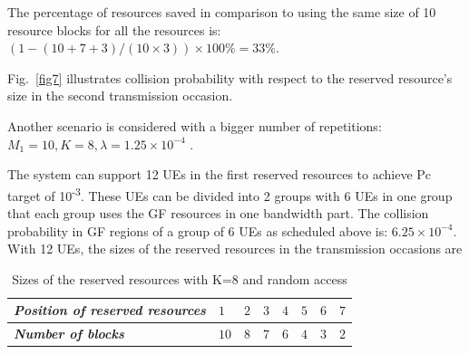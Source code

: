 \documentclass[conference]{IEEEtran}
\begin{document}

The percentage of resources saved in comparison to using the same size of 10 resource blocks for all the resources is: $(1 - (10+7+3)/(10\times3))\times100\% = 33\%$.

Fig.~\ref{fig7} illustrates collision probability with respect to the reserved resource's size in the second transmission occasion.

Another scenario is considered with a bigger number of repetitions: $M_1=10, K=8, \lambda=1.25\times10^{-4}$ .

The system can support 12 UEs in the first reserved resources to achieve Pc target of 10\textsuperscript{-3}. These UEs can be divided into 2 groups with 6 UEs in one group that each group uses the GF resources in one bandwidth part. The collision probability in GF regions of a group of 6 UEs as scheduled above is: $6.25\times10^{-4}$.
With 12 UEs, the sizes of the reserved resources in the transmission occasions are

\begin{table}[htbp]
\caption{Sizes of the reserved resources with K=8 and random access}
\begin{center}
\begin{tabular}{|p{5em}|p{2em}|p{2em}|p{2em}|p{2em}|p{2em}|p{2em}|p{2em}|}
 \hline
 \textbf{\textit{Position of reserved resources}} & $1$ &$2$ &$3$ & $4$ &$5$ &$6$ &$7$\\ 
 \hline
 \textbf{\textit{Number of blocks}} & $10$ &$8$ &$7$ & $6$ &$4$ &$3$ &$2$\\

 
 \hline
\end{tabular}
\label{tab2}
\end{center}
\end{table}
\end{document}

